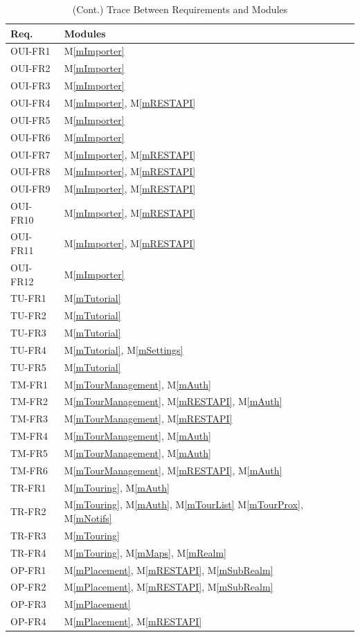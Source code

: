 \documentclass[12pt, titlepage]{article}
\newcommand{\mref}[1]{M\ref{#1}}
\begin{document}
\begin{table}[H]
\centering
\begin{tabular}{p{} p{}}
\toprule
\textbf{Req.} & \textbf{Modules}\\
\midrule
OUI-FR1 & \mref{mImporter}\\
OUI-FR2 & \mref{mImporter}\\
OUI-FR3 & \mref{mImporter}\\
OUI-FR4 & \mref{mImporter}, \mref{mRESTAPI}\\ 
OUI-FR5 & \mref{mImporter}\\
OUI-FR6 & \mref{mImporter}\\
OUI-FR7 & \mref{mImporter}, \mref{mRESTAPI}\\
OUI-FR8 & \mref{mImporter}, \mref{mRESTAPI}\\
OUI-FR9 & \mref{mImporter}, \mref{mRESTAPI}\\
OUI-FR10 & \mref{mImporter}, \mref{mRESTAPI}\\
OUI-FR11 & \mref{mImporter}, \mref{mRESTAPI}\\
OUI-FR12 & \mref{mImporter}\\
TU-FR1 & \mref{mTutorial}\\
TU-FR2 & \mref{mTutorial}\\
TU-FR3 & \mref{mTutorial}\\
TU-FR4 & \mref{mTutorial}, \mref{mSettings}\\
TU-FR5 & \mref{mTutorial}\\
TM-FR1 & \mref{mTourManagement}, \mref{mAuth}\\
TM-FR2 & \mref{mTourManagement}, \mref{mRESTAPI}, \mref{mAuth}\\
TM-FR3 & \mref{mTourManagement}, \mref{mRESTAPI}\\
TM-FR4 & \mref{mTourManagement}, \mref{mAuth}\\
TM-FR5 & \mref{mTourManagement}, \mref{mAuth}\\
TM-FR6 & \mref{mTourManagement}, \mref{mRESTAPI}, \mref{mAuth}\\
TR-FR1 & \mref{mTouring}, \mref{mAuth}\\
TR-FR2 & \mref{mTouring}, \mref{mAuth}, \mref{mTourList} \mref{mTourProx}, \mref{mNotifs}\\
TR-FR3 & \mref{mTouring}\\
TR-FR4 & \mref{mTouring}, \mref{mMaps}, \mref{mRealm}\\
OP-FR1 & \mref{mPlacement}, \mref{mRESTAPI}, \mref{mSubRealm}\\
OP-FR2 & \mref{mPlacement}, \mref{mRESTAPI}, \mref{mSubRealm}\\
OP-FR3 & \mref{mPlacement}\\
OP-FR4 & \mref{mPlacement}, \mref{mRESTAPI}\\
\bottomrule
\end{tabular}
\caption{(Cont.) Trace Between Requirements and Modules}
\label{TblRT}
\end{table}
\end{document}
